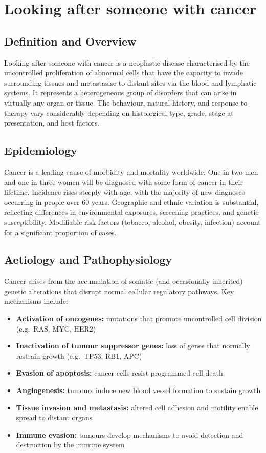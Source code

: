 \chapter{Looking after someone with cancer}

\section*{Definition and Overview}
Looking after someone with cancer is a neoplastic disease characterised by the uncontrolled proliferation of abnormal cells that have the capacity to invade surrounding tissues and metastasise to distant sites via the blood and lymphatic systems. It represents a heterogeneous group of disorders that can arise in virtually any organ or tissue. The behaviour, natural history, and response to therapy vary considerably depending on histological type, grade, stage at presentation, and host factors.

\section*{Epidemiology}
Cancer is a leading cause of morbidity and mortality worldwide. One in two men and one in three women will be diagnosed with some form of cancer in their lifetime. Incidence rises steeply with age, with the majority of new diagnoses occurring in people over 60 years. Geographic and ethnic variation is substantial, reflecting differences in environmental exposures, screening practices, and genetic susceptibility. Modifiable risk factors (tobacco, alcohol, obesity, infection) account for a significant proportion of cases.

\section*{Aetiology and Pathophysiology}
Cancer arises from the accumulation of somatic (and occasionally inherited) genetic alterations that disrupt normal cellular regulatory pathways. Key mechanisms include:

\begin{itemize}
    \item \textbf{Activation of oncogenes:} mutations that promote uncontrolled cell division (e.g.\ RAS, MYC, HER2)
    \item \textbf{Inactivation of tumour suppressor genes:} loss of genes that normally restrain growth (e.g.\ TP53, RB1, APC)
    \item \textbf{Evasion of apoptosis:} cancer cells resist programmed cell death
    \item \textbf{Angiogenesis:} tumours induce new blood vessel formation to sustain growth
    \item \textbf{Tissue invasion and metastasis:} altered cell adhesion and motility enable spread to distant organs
    \item \textbf{Immune evasion:} tumours develop mechanisms to avoid detection and destruction by the immune system
\end{itemize}

